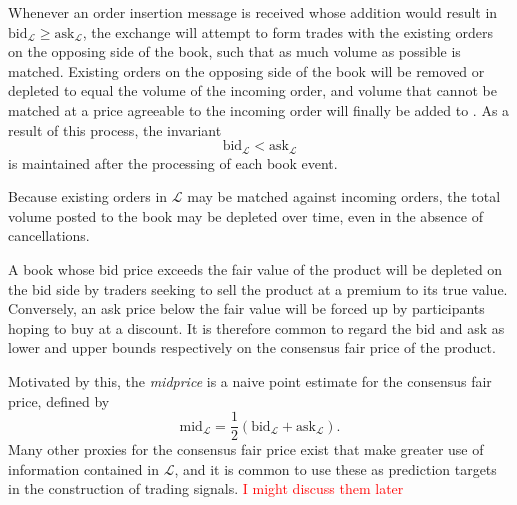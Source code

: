 \documentclass[honours,12pt]{unswthesis}
\numberwithin{equation}{section}
\begin{document}
Whenever an order insertion message is received whose addition would result in $\text{bid}_\mathcal{L}\geq \text{ask}_\mathcal{L}$, the exchange will attempt to form trades with the existing orders on the opposing side of the book, such that as much volume as possible is matched. Existing orders on the opposing side of the book will be removed or depleted to equal the volume of the incoming order, and volume that cannot be matched at a price agreeable to the incoming order will finally be added to . As a result of this process, the invariant
$$\text{bid}_\mathcal{L} < \text{ask}_\mathcal{L}$$
is maintained after the processing of each book event.

Because existing orders in $\mathcal{L}$ may be matched against incoming orders, the total volume posted to the book may be depleted over time, even in the absence of cancellations.

A book whose bid price exceeds the fair value of the product will be depleted on the bid side by traders seeking to sell the product at a premium to its true value. Conversely, an ask price below the fair value will be forced up by participants hoping to buy at a discount. It is therefore common to regard the bid and ask as lower and upper bounds respectively on the consensus fair price of the product.

Motivated by this, the \textit{midprice} is a naive point estimate for the consensus fair price, defined by
	$$\text{mid}_\mathcal{L} = \frac{1}{2}\left(\text{bid}_\mathcal{L} + \text{ask}_\mathcal{L}\right).$$
Many other proxies for the consensus fair price exist that make greater use of information contained in $\mathcal{L}$, and it is common to use these as prediction targets in the construction of trading signals. \textcolor{red}{I might discuss them later}
\end{document}
